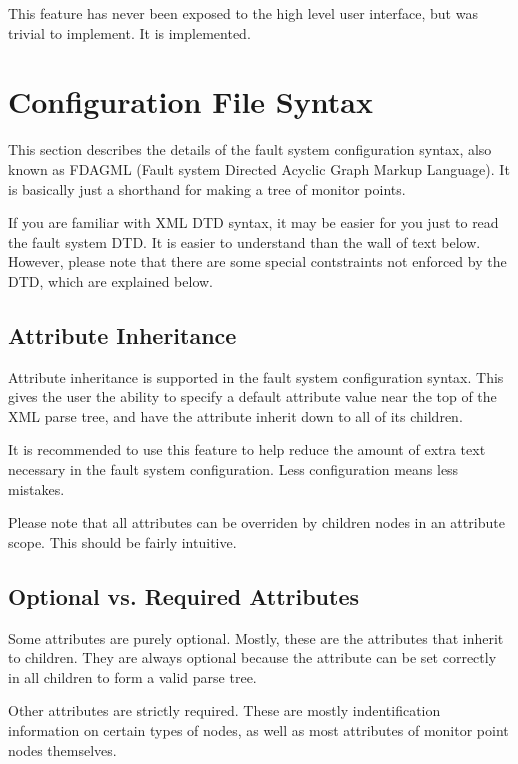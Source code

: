 \documentclass[letterpaper,12pt,oneside,pdftex]{article}
\begin{document}
This feature has never been exposed to the high level user interface, but was
trivial to implement. It is implemented.

\section{Configuration File Syntax}

This section describes the details of the fault system configuration syntax,
also known as FDAGML (Fault system Directed Acyclic Graph Markup Language). It
is basically just a shorthand for making a tree of monitor points.

If you are familiar with XML DTD syntax, it may be easier for you just to read
the fault system DTD. It is easier to understand than the wall of text below.
However, please note that there are some special contstraints not enforced by
the DTD, which are explained below.

\subsection{Attribute Inheritance}

Attribute inheritance is supported in the fault system configuration syntax.
This gives the user the ability to specify a default attribute value near the
top of the XML parse tree, and have the attribute inherit down to all of its
children.

It is recommended to use this feature to help reduce the amount of extra text
necessary in the fault system configuration. Less configuration means less
mistakes.

Please note that all attributes can be overriden by children nodes in an
attribute scope. This should be fairly intuitive.

\subsection{Optional vs. Required Attributes}

Some attributes are purely optional. Mostly, these are the attributes that
inherit to children. They are always optional because the attribute can be set
correctly in all children to form a valid parse tree.

Other attributes are strictly required. These are mostly indentification
information on certain types of nodes, as well as most attributes of monitor
point nodes themselves.
\end{document}
